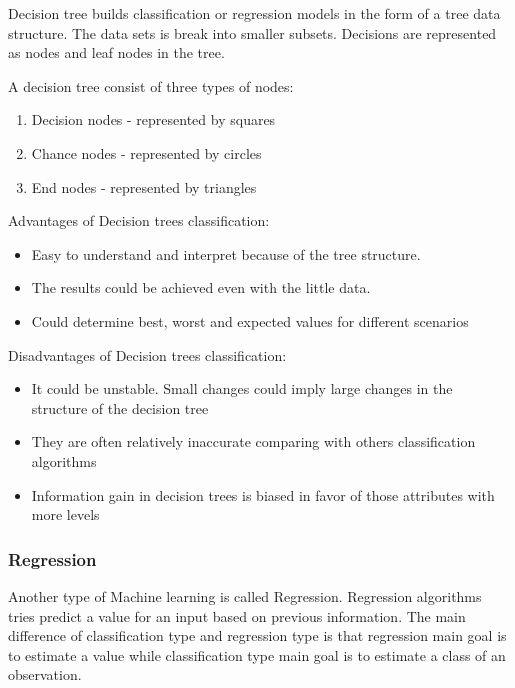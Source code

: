 \begin{enumerate}
    
    Decision tree builds classification or regression models in the form of a tree data structure. The data sets is break into smaller subsets. Decisions are represented as nodes and leaf nodes in the tree. 
    
    A decision tree consist of three types of nodes:
    
    \begin{enumerate}
        \item Decision nodes - represented by squares
        \item Chance nodes - represented by circles
        \item End nodes - represented by triangles
    \end{enumerate}
    
    Advantages of Decision trees classification:
    
    \begin{itemize}
        \item Easy to understand and interpret because of the tree structure.
        \item The results could be achieved even with the little data. 
        \item Could determine best, worst and expected values for different scenarios
    \end{itemize}
    
    Disadvantages of Decision trees classification:
    
    \begin{itemize}
        \item It could be unstable. Small changes could imply large changes in the structure of the decision tree
        \item They are often relatively inaccurate comparing with others classification algorithms
        \item Information gain in decision trees is biased in favor of those attributes with more levels
    \end{itemize}
\end{enumerate}

\subsubsection{Regression}

Another type of Machine learning is called Regression. Regression algorithms tries predict a value for an input based on previous information. The main difference of classification type and regression type is that regression main goal is to estimate a value while classification type main goal is to estimate a class of an observation. 

